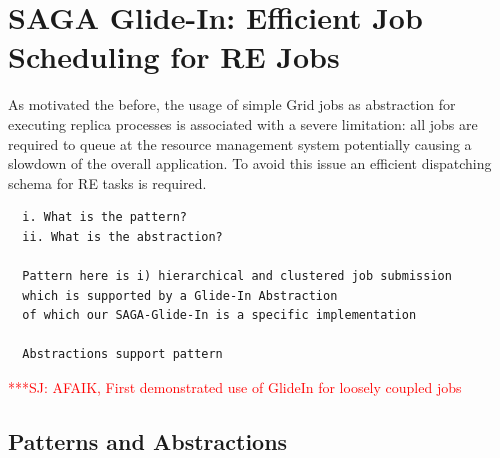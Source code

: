 \documentclass{rspublic}
\newcommand{\jhanote}[1]{ {\textcolor{red} { ***SJ: #1 }}}
\newcommand{\jhanote}[1]{}
\newcommand{\glidein}[1]{Glide-In }
\begin{document}
\section{SAGA Glide-In: Efficient Job Scheduling for RE Jobs}
\label{sec:glidein}

As motivated the before, the usage of simple Grid jobs as abstraction
for executing replica processes is associated with a severe
limitation: all jobs are required to queue at the resource management
system potentially causing a slowdown of the overall application.  To
avoid this issue an efficient dispatching schema for RE tasks is
required.

\begin{verbatim}
  i. What is the pattern?
  ii. What is the abstraction?

  Pattern here is i) hierarchical and clustered job submission 
  which is supported by a Glide-In Abstraction
  of which our SAGA-Glide-In is a specific implementation

  Abstractions support pattern

\end{verbatim}

\jhanote{AFAIK, First demonstrated use of GlideIn for loosely coupled
  jobs}





\subsection{Patterns and Abstractions} 



\end{document}
